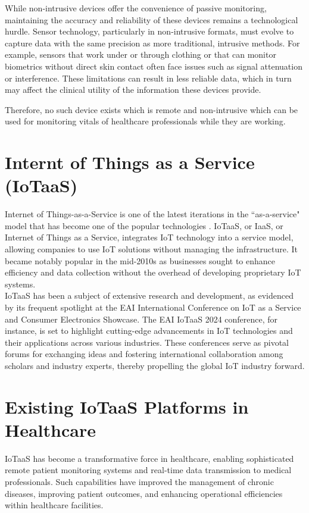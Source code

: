 \noindent While non-intrusive devices offer the convenience of passive monitoring, maintaining the accuracy and reliability of these devices remains a technological hurdle. Sensor technology, particularly in non-intrusive formats, must evolve to capture data with the same precision as more traditional, intrusive methods. For example, sensors that work under or through clothing or that can monitor biometrics without direct skin contact often face issues such as signal attenuation or interference. These limitations can result in less reliable data, which in turn may affect the clinical utility of the information these devices provide.


\noindent Therefore, no such device exists which is remote and non-intrusive which can be used for monitoring vitals of healthcare professionals while they are working.

\section{Internt of Things as a Service (IoTaaS)}
Internet of Things-as-a-Service is one of the latest iterations in the ``as-a-service" model that has become one of the popular technologies \cite{45}. IoTaaS, or IaaS, or Internet of Things as a Service, integrates IoT technology into a service model, allowing companies to use IoT solutions without managing the infrastructure. It became notably popular in the mid-2010s as businesses sought to enhance efficiency and data collection without the overhead of developing proprietary IoT systems. \\

\noindent IoTaaS has been a subject of extensive research and development, as evidenced by its frequent spotlight at the EAI International Conference on IoT as a Service and Consumer Electronics Showcase. The EAI IoTaaS 2024 conference, for instance, is set to highlight cutting-edge advancements in IoT technologies and their applications across various industries. These conferences serve as pivotal forums for exchanging ideas and fostering international collaboration among scholars and industry experts, thereby propelling the global IoT industry forward.\cite{46} 

\section{Existing IoTaaS Platforms in Healthcare}
IoTaaS has become a transformative force in healthcare, enabling sophisticated remote patient monitoring systems and real-time data transmission to medical professionals. Such capabilities have improved the management of chronic diseases, improving patient outcomes, and enhancing operational efficiencies within healthcare facilities. \\

